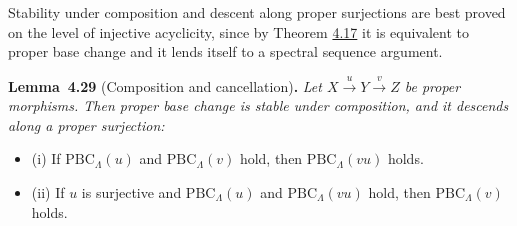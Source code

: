 \documentclass[11pt]{article}
\newenvironment{bpstatement}[2]{\par\addvspace{0.6\baselineskip}\noindent\textbf{#1}#2\textbf{.}\enspace\ignorespaces}
  {\par\addvspace{0.4\baselineskip}}
\newenvironment{bpstatementit}[2]{\begin{bpstatement}{#1}{#2}\itshape\ignorespaces}{\end{bpstatement}}
\begin{document}
\label{bp84}%
Stability under composition and descent along proper surjections are best proved on the level of injective acyclicity, since by Theorem \hyperref[bp45]{4.17} it is equivalent to proper base change and it lends itself to a spectral sequence argument.

\label{bp85}%
\begin{bpstatementit}{Lemma~4.29}{ (Composition and cancellation)}
Let \(X\xrightarrow{u}Y\xrightarrow{v}Z\) be proper morphisms. Then proper base change is stable under composition, and it descends along a proper surjection:

\begin{itemize}
\item (i) If \(\mathrm{PBC}_\Lambda(u)\) and \(\mathrm{PBC}_\Lambda(v)\) hold, then \(\mathrm{PBC}_\Lambda(vu)\) holds.
\item (ii) If \(u\) is surjective and \(\mathrm{PBC}_\Lambda(u)\) and \(\mathrm{PBC}_\Lambda(vu)\) hold, then \(\mathrm{PBC}_\Lambda(v)\) holds.
\end{itemize}
\end{bpstatementit}
\end{document}
